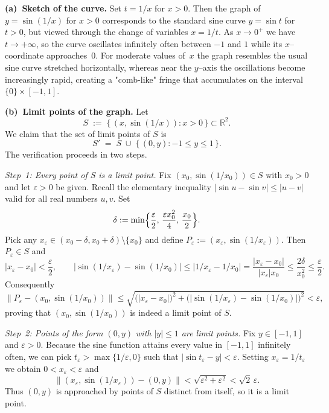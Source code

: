 \documentclass[10pt]{extarticle}
\begin{document}
\begin{solution}
    \textbf{(a)~Sketch of the curve.}  Set $t = 1/x$ for $x>0$.  Then the graph of $y = \sin(1/x)$ for $x>0$ corresponds to the standard sine curve $y = \sin t$ for $t>0$, but viewed through the change of variables $x = 1/t$.  As $x \to 0^{+}$ we have $t \to +\infty$, so the curve oscillates infinitely often between $-1$ and $1$ while its $x$--coordinate approaches~$0$.  For moderate values of~$x$ the graph resembles the usual sine curve stretched horizontally, whereas near the $y$--axis the oscillations become increasingly rapid, creating a "comb-like" fringe that accumulates on the interval $\{0\}\times[-1,1]$.

    \medskip
    \textbf{(b)~Limit points of the graph.}  Let
    $$
        S \;:=\; \bigl\{\,(x,\sin(1/x)) : x>0\,\bigr\}\subset \mathbb{R}^{2}.
    $$
    We claim that the set of limit points of $S$ is
    $$
        S' \;=\; S \;\cup\; \bigl\{\,(0,y) : -1 \le y \le 1\,\bigr\}.
    $$
    The verification proceeds in two steps.

    \medskip
    \emph{Step~1:  Every point of $S$ is a limit point.}  Fix $(x_{0},\sin(1/x_{0})) \in S$ with $x_{0}>0$ and let $\varepsilon>0$ be given.  Recall the elementary inequality $|\sin u-\sin v|\le |u-v|$ valid for all real numbers $u,v$.  Set
    $$
        \delta := \min\Bigl\{\frac{\varepsilon}{2},\, \frac{\varepsilon x_{0}^{2}}{4},\, \frac{x_{0}}{2}\Bigr\}.
    $$
    Pick any $x_{\varepsilon}\in(x_{0}-\delta,x_{0}+\delta)\setminus\{x_{0}\}$ and define $P_{\varepsilon}:=(x_{\varepsilon},\sin(1/x_{\varepsilon}))$.  Then $P_{\varepsilon}\in S$ and
    $$
        |x_{\varepsilon}-x_{0}|<\frac{\varepsilon}{2},\qquad |\sin(1/x_{\varepsilon})-\sin(1/x_{0})|\le |1/x_{\varepsilon}-1/x_{0}|=\frac{|x_{\varepsilon}-x_{0}|}{|x_{\varepsilon}|x_{0}}\le \frac{2\delta}{x_{0}^{2}}\le \frac{\varepsilon}{2}.
    $$
    Consequently
    $$
        \bigl\|P_{\varepsilon}-(x_{0},\sin(1/x_{0}))\bigr\|\le \sqrt{\bigl(|x_{\varepsilon}-x_{0}|\bigr)^{2}+\bigl(|\sin(1/x_{\varepsilon})-\sin(1/x_{0})|\bigr)^{2}}<\varepsilon,
    $$
    proving that $(x_{0},\sin(1/x_{0}))$ is indeed a limit point of $S$.

    \medskip
    \emph{Step~2:  Points of the form $(0,y)$ with $|y|\le 1$ are limit points.}  Fix $y\in[-1,1]$ and $\varepsilon>0$.  Because the sine function attains every value in $[-1,1]$ infinitely often, we can pick $t_{\varepsilon}>\max\{1/\varepsilon,0\}$ such that $|\sin t_{\varepsilon}-y|<\varepsilon$.  Setting $x_{\varepsilon}=1/t_{\varepsilon}$ we obtain $0<x_{\varepsilon}<\varepsilon$ and
    $$
        \bigl\|(x_{\varepsilon},\sin(1/x_{\varepsilon}))-(0,y)\bigr\|<\sqrt{\varepsilon^{2}+\varepsilon^{2}}<\sqrt{2}\,\varepsilon.
    $$
    Thus $(0,y)$ is approached by points of $S$ distinct from itself, so it is a limit point.


\end{solution}
\end{document}
